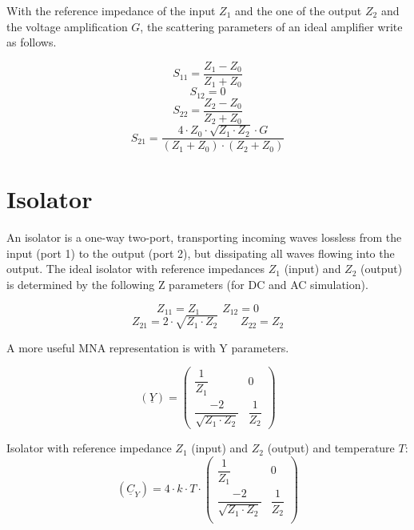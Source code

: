 With the reference
impedance of the input $Z_1$ and the one of the output $Z_2$ and the
voltage amplification $G$, the scattering parameters of an ideal
amplifier write as follows.

\begin{equation}
S_{11} = \frac{Z_1-Z_0}{Z_1+Z_0}
\end{equation}
\begin{equation}
S_{12} = 0
\end{equation}
\begin{equation}
S_{22} = \frac{Z_2-Z_0}{Z_2+Z_0}
\end{equation}
\begin{equation}
S_{21} = \frac{4\cdot Z_0\cdot\sqrt{Z_1\cdot Z_2}\cdot G}{(Z_1+Z_0)\cdot(Z_2+Z_0)}
\end{equation}


\section{Isolator}

An isolator is a one-way two-port, transporting incoming waves
lossless from the input (port 1) to the output (port 2), but dissipating
all waves flowing into the output.
The ideal isolator with reference impedances $Z_1$ (input) and $Z_2$
(output) is determined by the following Z parameters (for DC and
AC simulation).

\begin{equation}
Z_{11} = Z_1  \qquad
Z_{12} = 0
\end{equation}
\begin{equation}
Z_{21} = 2\cdot\sqrt{Z_1\cdot Z_2}  \qquad
Z_{22} = Z_2
\end{equation}

A more useful MNA representation is with Y parameters.

\begin{equation}
(\underline{Y}) =
\begin{pmatrix}
 \dfrac{1}{Z_1} & 0 \\
 \dfrac{-2}{\sqrt{Z_1\cdot Z_2}} & \dfrac{1}{Z_2}
\end{pmatrix}
\end{equation}

Isolator with reference impedance $Z_1$ (input) and $Z_2$ (output) and
temperature $T$:
\begin{equation}
(\underline{C}_Y) = 4\cdot k\cdot T\cdot
\begin{pmatrix}
 \dfrac{1}{Z_1} & 0 \\
 \dfrac{-2}{\sqrt{Z_1\cdot Z_2}} &  \dfrac{1}{Z_2} \\
\end{pmatrix}
\end{equation}

